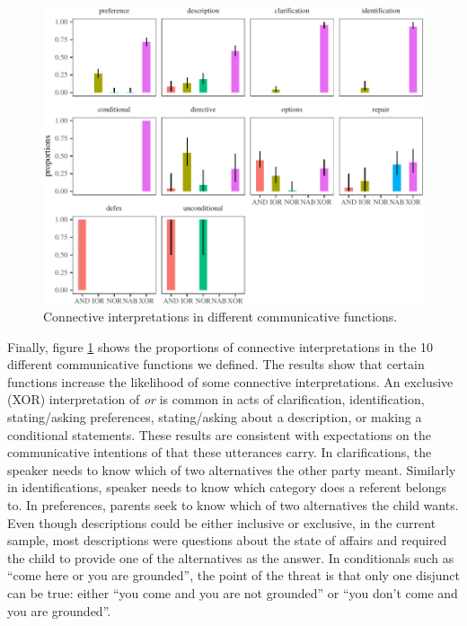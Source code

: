 \documentclass[floatsintext,man]{apa6}
\theoremstyle{definition}
\theoremstyle{definition}
\theoremstyle{definition}
\theoremstyle{remark}
\begin{document}
\begin{figure}[tb]

{\centering \includegraphics{figs/speechActPlot-1} 

}

\caption{Connective interpretations in different communicative functions.}\label{fig:speechActPlot}
\end{figure}

Finally, figure \ref{fig:speechActPlot} shows the proportions of
connective interpretations in the 10 different communicative functions
we defined. The results show that certain functions increase the
likelihood of some connective interpretations. An exclusive (XOR)
interpretation of \emph{or} is common in acts of clarification,
identification, stating/asking preferences, stating/asking about a
description, or making a conditional statements. These results are
consistent with expectations on the communicative intentions of that
these utterances carry. In clarifications, the speaker needs to know
which of two alternatives the other party meant. Similarly in
identifications, speaker needs to know which category does a referent
belongs to. In preferences, parents seek to know which of two
alternatives the child wants. Even though descriptions could be either
inclusive or exclusive, in the current sample, most descriptions were
questions about the state of affairs and required the child to provide
one of the alternatives as the answer. In conditionals such as
\enquote{come here or you are grounded}, the point of the threat is that
only one disjunct can be true: either \enquote{you come and you are not
grounded} or \enquote{you don't come and you are grounded}.
\end{document}
